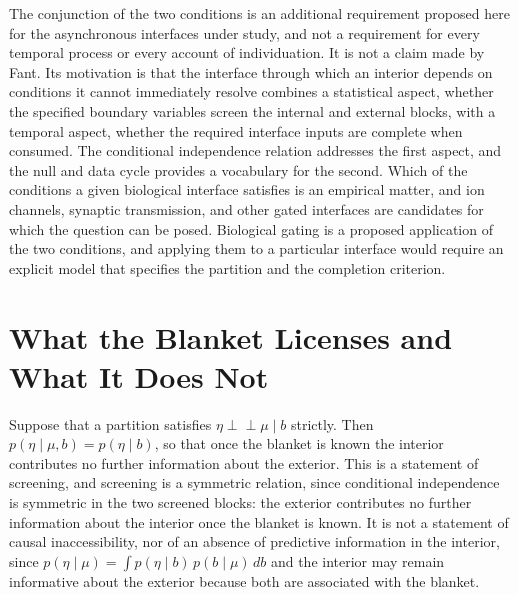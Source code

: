 \documentclass[11pt]{article}
\theoremstyle{definition}
\newcommand{\Ind}{\perp\!\!\!\perp}
\begin{document}
The conjunction of the two conditions is an additional requirement proposed here for the asynchronous interfaces under study, and not a requirement for every temporal process or every account of individuation. It is not a claim made by Fant. Its motivation is that the interface through which an interior depends on conditions it cannot immediately resolve combines a statistical aspect, whether the specified boundary variables screen the internal and external blocks, with a temporal aspect, whether the required interface inputs are complete when consumed. The conditional independence relation addresses the first aspect, and the null and data cycle provides a vocabulary for the second. Which of the conditions a given biological interface satisfies is an empirical matter, and ion channels, synaptic transmission, and other gated interfaces are candidates for which the question can be posed. Biological gating is a proposed application of the two conditions, and applying them to a particular interface would require an explicit model that specifies the partition and the completion criterion.

\section{What the Blanket Licenses and What It Does Not}

Suppose that a partition satisfies $\eta\Ind\mu\mid b$ strictly. Then $p(\eta\mid\mu,b)=p(\eta\mid b)$, so that once the blanket is known the interior contributes no further information about the exterior. This is a statement of screening, and screening is a symmetric relation, since conditional independence is symmetric in the two screened blocks: the exterior contributes no further information about the interior once the blanket is known. It is not a statement of causal inaccessibility, nor of an absence of predictive information in the interior, since $p(\eta\mid\mu)=\int p(\eta\mid b)\,p(b\mid\mu)\,db$ and the interior may remain informative about the exterior because both are associated with the blanket.
\end{document}
